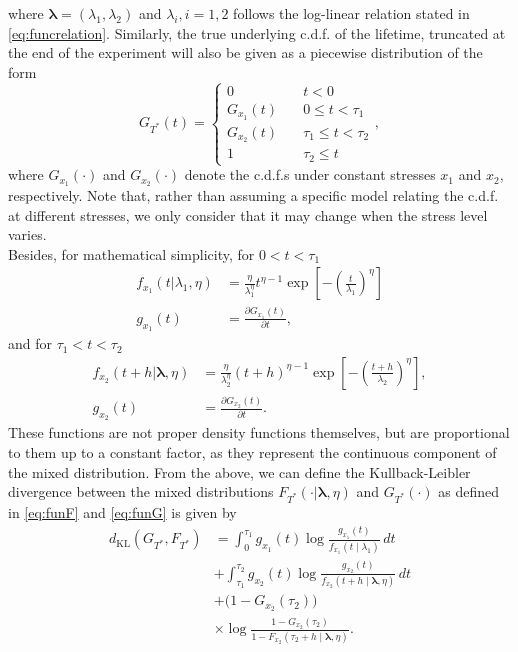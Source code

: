 \documentclass{article}
\begin{document}
where $\boldsymbol{\lambda} =\left(\lambda_1, \lambda_2 \right) $ and $\lambda_i, i =1,2$  follows the log-linear relation stated in \eqref{eq:funcrelation}.
Similarly, the true underlying c.d.f. of the lifetime, truncated at the end of the experiment will also be given as a piecewise distribution of the form
\begin{equation}
	G_{T^\ast}(t)=
	\begin{cases}
		0 \quad & t<0
		\\
		G_{x_1}(t) \quad & 0 \leq t <\tau_1
		\\
		G_{x_2}(t) \quad & \tau_1 \leq t < \tau_2
		\\
		1 \quad & \tau_2 \leq t
	\end{cases},
\label{eq:funG}
\end{equation}
where $G_{x_1}(\cdot)$ and $G_{x_2}(\cdot)$ denote the c.d.f.s under constant stresses $x_1$ and $x_2$, respectively.
Note that, rather than assuming a specific model relating the c.d.f. at different stresses, we only consider that it may change when the stress level varies.
\\
Besides, for mathematical simplicity, for $0 < t <\tau_1$
\begin{align}
	f_{x_1}(t|\lambda_1,\eta)&=\frac{\eta}{\lambda_1^{\eta}}t^{\eta-1}\exp\left[-\left(\frac{t}{\lambda_1}\right)^{\eta}\right] \nonumber
	\\
	 g_{x_1}(t)&=\frac{\partial G_{x_1}(t)}{\partial t} \nonumber,
\end{align}
and for $\tau_1<t<\tau_2$
\begin{align}
	f_{x_2}(t+h|\boldsymbol{\lambda},\eta)&=\frac{\eta}{\lambda_2^{\eta}}\left(t+h\right)^{\eta-1}\exp\left[-\left(\frac{t+h}{\lambda_2}\right)^{\eta}\right] , \nonumber
	\\
	g_{x_2}(t)&=\frac{\partial G_{x_2}(t)}{\partial t} \nonumber . 
\end{align}
These functions are not proper density functions themselves, but are proportional to them up to a constant factor, as they represent the continuous component of the mixed distribution.
From the above, we can define the Kullback-Leibler divergence between the mixed distributions $F_{T^\ast}(\cdot|\boldsymbol{\lambda},\eta)$ and $G_{T^\ast}(\cdot)$ as defined in \eqref{eq:funF} and \eqref{eq:funG} is given by
\begin{equation}
\begin{aligned}
d_{\mathrm{KL}}\!\left(
G_{T^{\ast}}, F_{T^{\ast}}
\right)
&=
\int_{0}^{\tau_1}
g_{x_1}(t)
\log\!\frac{g_{x_1}(t)}
{f_{x_1}(t \mid \lambda_1)}
\, dt
\\
&
+ \int_{\tau_1}^{\tau_2}
g_{x_2}(t)
\log\!\frac{g_{x_2}(t)}
{f_{x_2}(t+h \mid \boldsymbol{\lambda},\eta)}
\, dt
\\
&
+ \bigl(1-G_{x_2}(\tau_2)\bigr)
\\
&\times
\log\!\frac{1-G_{x_2}(\tau_2)}
{1-F_{x_2}(\tau_2+h \mid \boldsymbol{\lambda},\eta)} .
\end{aligned}
\label{eq:kl_def}
\end{equation}
\end{document}
